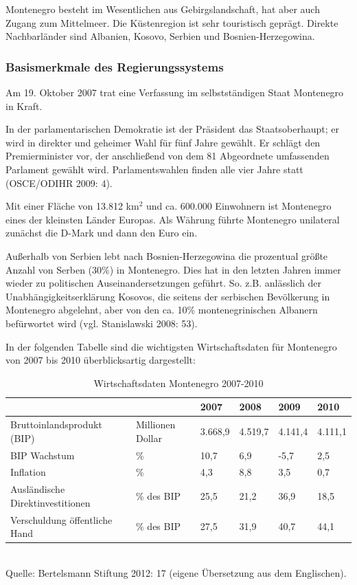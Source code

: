 Montenegro besteht im Wesentlichen aus Gebirgslandschaft, hat aber auch Zugang zum Mittelmeer. Die Küstenregion ist sehr touristisch geprägt. Direkte Nachbarländer sind Albanien, Kosovo, Serbien und Bosnien-Herzegowina.


\subsubsection{Basismerkmale des Regierungssystems }

Am 19. Oktober 2007 trat eine Verfassung im selbstständigen Staat Montenegro in Kraft.\par
In der parlamentarischen Demokratie ist der Präsident das Staatsoberhaupt; er wird in direkter und geheimer Wahl für fünf Jahre gewählt. Er schlägt den Premierminister vor, der anschließend von dem 81 Abgeordnete umfassenden Parlament gewählt wird. Parlamentswahlen finden alle vier Jahre statt (OSCE/ODIHR 2009: 4).\par
Mit einer Fläche von 13.812 km$^2$ und ca. 600.000 Einwohnern ist Montenegro eines der kleinsten Länder Europas. Als Währung führte Montenegro unilateral zunächst die D-Mark und dann den Euro ein.\par
Außerhalb von Serbien lebt nach Bosnien-Herzegowina die prozentual größte Anzahl von Serben (30\%) in Montenegro. Dies hat in den letzten Jahren immer wieder zu politischen Auseinandersetzungen geführt. So. z.B. anlässlich der Unabhängigkeitserklärung Kosovos, die seitens der serbischen Bevölkerung in Montenegro abgelehnt, aber von den ca. 10\% montenegrinischen Albanern befürwortet wird (vgl. Stanislawski 2008: 53).\par
In der folgenden Tabelle sind die wichtigsten Wirtschaftsdaten für Montenegro von 2007 bis 2010 überblicksartig dargestellt:

\begin{table}[H]
\caption{Wirtschaftsdaten Montenegro 2007-2010}
\small{
\begin{tabular}{|R{46mm}|R{25mm}|R{15mm}|R{15mm}|R{15mm}|R{15mm}|}\hline
&&2007&2008&2009&2010\\\hline
Bruttoinlandsprodukt (BIP)&
Millionen Dollar&3.668,9&4.519,7&4.141,4&4.111,1\\\hline
BIP Wachstum&\%&10,7&6,9&-5,7&2,5\\\hline
Inflation &\%&4,3&8,8&3,5&0,7\\\hline
Ausländische Direktinvestitionen &\% des BIP&25,5&21,2&36,9&18,5\\\hline
Verschuldung öffentliche Hand&\% des BIP&27,5&31,9&40,7&44,1\\\hline
\end{tabular}\\
Quelle: Bertelsmann Stiftung 2012: 17 (eigene Übersetzung aus dem Englischen).}
\end{table}
 


